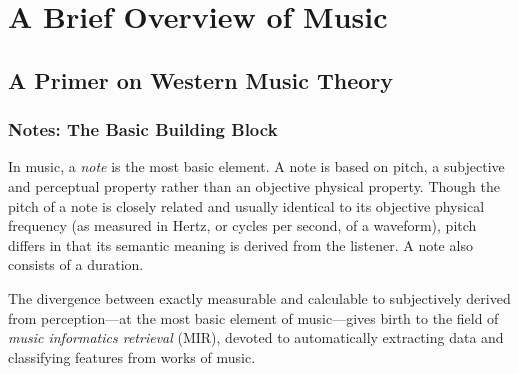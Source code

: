 \chapter{A Brief Overview of Music}

\section{A Primer on Western Music Theory}

\subsection{Notes: The Basic Building Block}

In music, a \textit{note} is the most basic element. A note is based on pitch, a subjective and perceptual property rather than an objective physical property. Though the pitch of a note is closely related and usually identical to its objective physical frequency (as measured in Hertz, or cycles per second, of a waveform), pitch differs in that its semantic meaning is derived from the listener. A note also consists of a duration.



The divergence between exactly measurable and calculable to subjectively derived from perception---at the most basic element of music---gives birth to the field of \textit{music informatics retrieval} (MIR), devoted to automatically extracting data and classifying features from works of music.